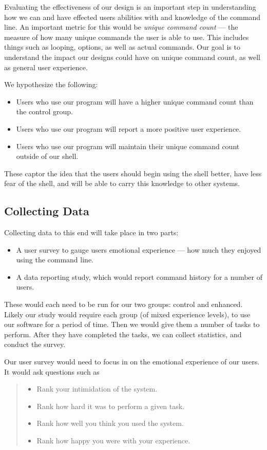 Evaluating the effectiveness of our design is an important step in understanding
how we can and have effected users abilities with and knowledge of the command
line. An important metric for this would be \emph{unique command count} --- the
measure of how many unique commands the user is able to use. This includes
things such as looping, options, as well as actual commands. Our goal is to
understand the impact our designs could have on unique command count, as well as
general user experience.

We hypothesize the following:
\begin{itemize}
  \item Users who use our program will have a higher unique command count than
  the control group.
  \item Users who use our program will report a more positive user experience.
  \item Users who use our program will maintain their unique command count
  outside of our shell.
\end{itemize}
These captor the idea that the users should begin using the shell better, have
less fear of the shell, and will be able to carry this knowledge to other systems.

\subsection{Collecting Data}
Collecting data to this end will take place in two parts:
\begin{itemize}
  \item A user survey to gauge users emotional experience --- how much they
  enjoyed using the command line.
  \item A data reporting study, which would report command history for a number
  of users.
\end{itemize}
These would each need to be run for our two groups: control and enhanced. Likely
our study would require each group (of mixed experience levels), to use our
software for a period of time. Then we would give them a number of tasks to
perform. After they have completed the tasks, we can collect statistics, and
conduct the survey.

Our user survey would need to focus in on the emotional experience of our
users. It would ask questions such as
\begin{quote}
  \begin{itemize}
    \item Rank your intimidation of the system.
    \item Rank how hard it was to perform a given task.
    \item Rank how well you think you used the system.
    \item Rank how happy you were with your experience.
  \end{itemize}
\end{quote}

